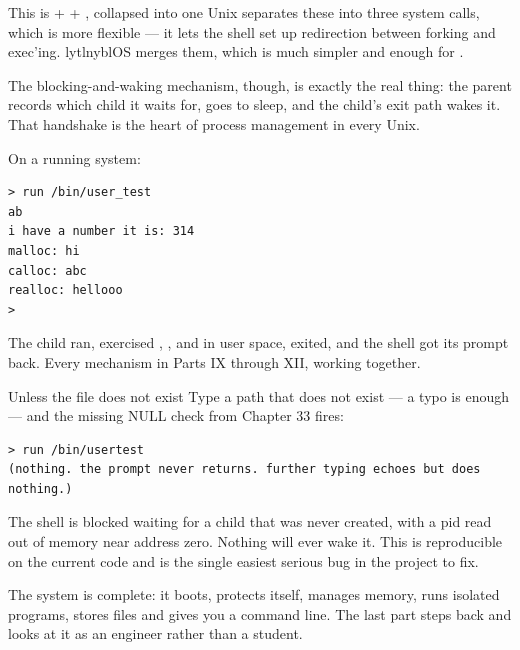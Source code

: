 \begin{concept}{This is  +  + , collapsed into one}
Unix separates these into three system calls, which is more flexible --- it lets the shell set up
redirection between forking and exec'ing. lytlnyblOS merges them, which is much simpler and enough
for .

The blocking-and-waking mechanism, though, is exactly the real thing: the parent records which child
it waits for, goes to sleep, and the child's exit path wakes it. That handshake is the heart of
process management in every Unix.
\end{concept}

\begin{tryit}
On a running system:
\begin{lstlisting}[style=txt]
> run /bin/user_test
ab
i have a number it is: 314
malloc: hi
calloc: abc
realloc: hellooo
>
\end{lstlisting}
The child ran, exercised , ,  and  in user space,
exited, and the shell got its prompt back. Every mechanism in Parts IX through XII, working
together.
\end{tryit}

\begin{danger}{Unless the file does not exist}
Type a path that does not exist --- a typo is enough --- and the missing NULL check from Chapter 33
fires:
\begin{lstlisting}[style=txt]
> run /bin/usertest
(nothing. the prompt never returns. further typing echoes but does nothing.)
\end{lstlisting}
The shell is blocked waiting for a child that was never created, with a pid read out of memory near
address zero. Nothing will ever wake it. This is reproducible on the current code and is the single
easiest serious bug in the project to fix.
\end{danger}

\begin{summary}
The system is complete: it boots, protects itself, manages memory, runs isolated programs,
stores files and gives you a command line. The last part steps back and looks at it as an engineer
rather than a student.
\end{summary}
